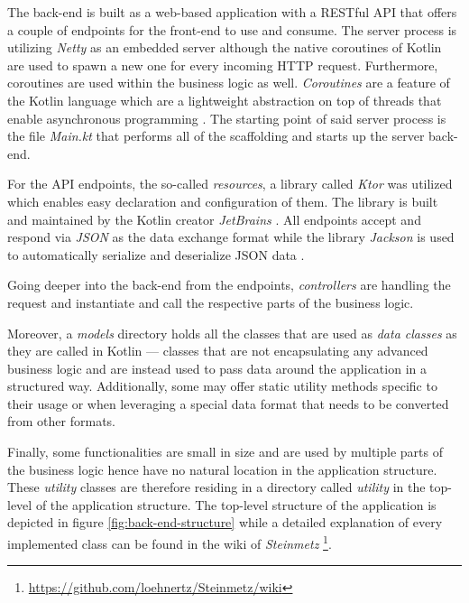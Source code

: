 \documentclass[12pt,a4paper]{report}
\begin{document}
The back-end is built as a web-based application with a RESTful API that offers
a couple of endpoints for the front-end to use and consume.
The server process is utilizing \textit{Netty} \cite{ktor-netty} as an embedded
server although the native coroutines of Kotlin are used to spawn a new one for
every incoming HTTP request.
Furthermore, coroutines are used within the business logic as well.
\textit{Coroutines} are a feature of the Kotlin language which are a lightweight
abstraction on top of threads that enable asynchronous programming \cite{kotlin-coroutines}.
The starting point of said server process is the file \textit{Main.kt} that
performs all of the scaffolding and starts up the server back-end.

For the API endpoints, the so-called \textit{resources}, a library called
\textit{Ktor} was utilized which enables easy declaration and configuration
of them. The library is built and maintained by the Kotlin creator
\textit{JetBrains} \cite{ktor}.
All endpoints accept and respond via \textit{JSON} as the data exchange format
while the library \textit{Jackson} is used to automatically serialize and
deserialize JSON data \cite{ktor-jackson}.

Going deeper into the back-end from the endpoints, \textit{controllers} are handling
the request and instantiate and call the respective parts of the business logic.

Moreover, a \textit{models} directory holds all the classes that are used
as \textit{data classes} as they are called in Kotlin --- classes that are not
encapsulating any advanced business logic and are instead used to pass data around
the application in a structured way. Additionally, some may offer static utility
methods specific to their usage or when leveraging a special data format that
needs to be converted from other formats.

Finally, some functionalities are small in size and are used by multiple parts
of the business logic hence have no natural location in the application structure.
These \textit{utility} classes are therefore residing in a directory called
\textit{utility} in the top-level of the application structure.
The top-level structure of the application is depicted in figure
\ref{fig:back-end-structure} while a detailed explanation of every implemented
class can be found in the wiki of \textit{Steinmetz}
\footnote{\url{https://github.com/loehnertz/Steinmetz/wiki}}.
\end{document}
